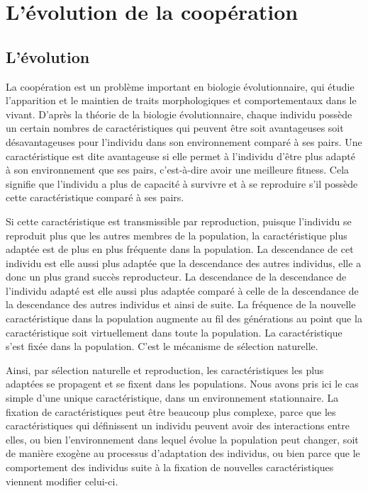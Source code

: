 \section{L'évolution de la coopération}

\subsection{L'évolution}
\label{ssec:evolution}

La coopération est un problème important en biologie évolutionnaire, qui étudie l'apparition et le maintien de traits morphologiques et comportementaux dans le vivant. D'après la théorie de la biologie évolutionnaire, chaque individu possède un certain nombres de caractéristiques qui peuvent être soit avantageuses soit désavantageuses pour l'individu dans son environnement comparé à ses pairs. Une caractéristique est dite avantageuse si elle permet à l'individu d'être plus adapté à son environnement que ses pairs, c'est-à-dire avoir une meilleure fitness. Cela signifie que l'individu a plus de capacité à survivre et à se reproduire s'il possède cette caractéristique comparé à ses pairs.

Si cette caractéristique est transmissible par reproduction, puisque l'individu se reproduit plus que les autres membres de la population, la caractéristique plus adaptée est de plus en plus fréquente dans la population. La descendance de cet individu est elle aussi plus adaptée que la descendance des autres individus, elle a donc un plus grand succès reproducteur. La descendance de la descendance de l'individu adapté est elle aussi plus adaptée comparé à celle de la descendance de la descendance des autres individus et ainsi de suite. La fréquence de la nouvelle caractéristique dans la population augmente au fil des générations au point que la caractéristique soit virtuellement dans toute la population. La caractéristique s'est fixée dans la population. C'est le mécanisme de sélection naturelle.

Ainsi, par sélection naturelle et reproduction, les caractéristiques les plus adaptées se propagent et se fixent dans les populations. Nous avons pris ici le cas simple d'une unique caractéristique, dans un environnement stationnaire. La fixation de caractéristiques peut être beaucoup plus complexe, parce que les caractéristiques qui définissent un individu peuvent avoir des interactions entre elles, ou bien l'environnement dans lequel évolue la population peut changer, soit de manière exogène au processus d'adaptation des individus, ou bien parce que le comportement des individus suite à la fixation de nouvelles caractéristiques viennent modifier celui-ci.


